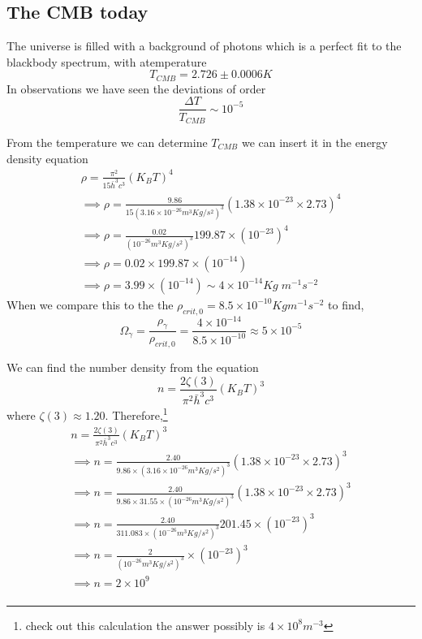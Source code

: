 \documentclass[12pt]{report}
\newcommand{\fn}[1]{\footnote{#1}}
\begin{document}
\subsection{The CMB today}
The universe is filled with a background of photons which is a perfect fit to the blackbody spectrum, with atemperature
\begin{equation}
T_{CMB}= 2.726 \pm 0.0006 K 
\end{equation}
In observations we have seen the deviations of order 
\begin{equation}
\frac{\Delta T}{T_{CMB}} \sim 10^{-5}
\end{equation}

From the temperature we can determine $T_{CMB}$ we can insert it in the energy density equation 
\begin{eqnarray*}
\rho = \frac{\pi^2}{15\bar{h}^3 c^3}(K_B T)^4\\
\implies \rho = \frac{9.86}{15 (3.16 \times 10^{-26} m^3 Kg/s^2)^3}(1.38 \times 10^{-23} \times  2.73)^4\\
\implies \rho = \frac{0.02}{(10^{-26} m^3 Kg/s^2)^3}199.87 \times (10^{-23})^4\\
\implies \rho = 0.02 \times 199.87 \times (10^{-14})\\
\implies \rho = 3.99 \times (10^{-14}) \sim 4 \times 10^{-14} Kg \; m^{-1} s^{-2}
\end{eqnarray*}
When we compare this to the the $\rho_{crit,0}= 8.5 \times 10^{-10} Kg m^{-1} s^{-2}$ to find,
\begin{equation}
\Omega_{\gamma}=\frac{\rho_{\gamma}}{\rho_{crit,0}}= \frac{4 \times 10^{-14}}{8.5 \times 10^{-10}} \approx 5 \times 10^{-5}
\end{equation}

We can find the number density from the equation
\begin{equation}
n=\frac{2\zeta(3)}{\pi^2 \bar{h}^3 c^3}(K_BT)^3
\end{equation}
where $\zeta(3) \approx 1.20$. Therefore,\fn{check out this calculation the answer possibly is $4 \times 10^8 m^{-3}$}
\begin{eqnarray*}
n=\frac{2\zeta(3)}{\pi^2 \bar{h}^3 c^3}(K_BT)^3\\
\implies n=\frac{2.40}{9.86 \times (3.16 \times 10^{-26} m^3 Kg/s^2)^3}(1.38 \times 10^{-23} \times  2.73)^3\\
\implies n=\frac{2.40}{9.86 \times 31.55 \times(  10^{-26} m^3 Kg/s^2)^3}(1.38 \times 10^{-23} \times  2.73)^3\\
\implies n=\frac{2.40}{311.083 \times(  10^{-26} m^3 Kg/s^2)^3} 201.45 \times (10^{-23} )^3\\
\implies n=\frac{2}{(  10^{-26} m^3 Kg/s^2)^3}\times (10^{-23} )^3\\
\implies n=2 \times 10^{9}\\
\end{eqnarray*}
\end{document}
